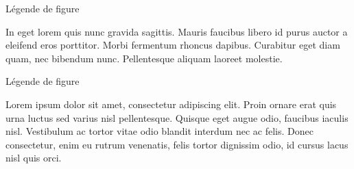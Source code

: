 \documentclass[year=2013]{jres}
\begin{document}
Légende de figure

In eget lorem quis nunc gravida sagittis. Mauris faucibus libero id purus auctor a eleifend eros porttitor. Morbi fermentum rhoncus dapibus. Curabitur eget diam quam, nec bibendum nunc. Pellentesque aliquam laoreet molestie. 

Légende de figure

Lorem ipsum dolor sit amet, consectetur adipiscing elit. Proin ornare erat quis urna luctus sed varius nisl pellentesque. Quisque eget augue odio, faucibus iaculis nisl. Vestibulum ac tortor vitae odio blandit interdum nec ac felis. Donec consectetur, enim eu rutrum venenatis, felis tortor dignissim odio, id cursus lacus nisl quis orci.


\nocite{*}

\end{document}
